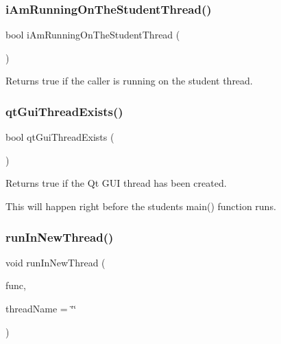 \subsubsection{\texorpdfstring{i\+Am\+Running\+On\+The\+Student\+Thread()}{iAmRunningOnTheStudentThread()}}
{\footnotesize\ttfamily bool i\+Am\+Running\+On\+The\+Student\+Thread (\begin{DoxyParamCaption}{ }\end{DoxyParamCaption})\hspace{0.3cm}{\ttfamily [static]}}



Returns true if the caller is running on the student thread. 

\mbox{\label{classGThread_afee663b5d7998135c2aab0585b2ad37f}} 
\subsubsection{\texorpdfstring{qt\+Gui\+Thread\+Exists()}{qtGuiThreadExists()}}
{\footnotesize\ttfamily bool qt\+Gui\+Thread\+Exists (\begin{DoxyParamCaption}{ }\end{DoxyParamCaption})\hspace{0.3cm}{\ttfamily [static]}}



Returns true if the Qt G\+UI thread has been created. 

This will happen right before the student\textquotesingle{}s main() function runs. \mbox{\label{classGThread_ad70a32318f3f0a9cf25582379c6d7ffb}} 
\subsubsection{\texorpdfstring{run\+In\+New\+Thread()}{runInNewThread()}}
{\footnotesize\ttfamily void run\+In\+New\+Thread (\begin{DoxyParamCaption}\item[{G\+Thunk}]{func,  }\item[{const std\+::string \&}]{thread\+Name = {\ttfamily \char`\"{}\char`\"{}} }\end{DoxyParamCaption})\hspace{0.3cm}{\ttfamily [static]}}



